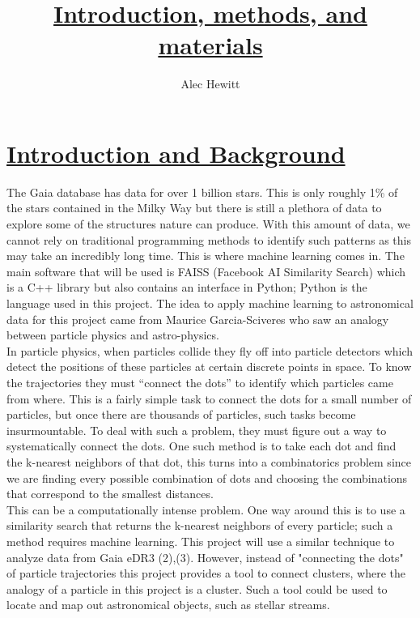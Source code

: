 \documentclass[12pt]{amsart}
\begin{document}
\title{\underline{Introduction, methods, and materials}}
\author{Alec Hewitt}
\maketitle

\setlength\parindent{24pt}

\section{\underline{Introduction and Background}}

\indent The Gaia database has data for over 1 billion stars. This is only roughly 1\% of the stars
contained in the Milky Way but there is still a plethora of data to explore some of the structures
nature can produce. With this amount of data, we cannot rely on traditional programming methods to identify such patterns as this may take an incredibly long time. This is where machine
learning comes in. The main software that will be used is FAISS (Facebook AI Similarity
Search) which is a C++ library but also contains an interface in Python; Python is the language
used in this project. The idea to apply machine learning to astronomical data for this project
came from Maurice Garcia-Sciveres who saw an analogy between particle physics and astro-physics.\\

\indent In particle physics, when particles collide they fly off into particle detectors which detect
the positions of these particles at certain discrete points in space. To know the trajectories they
must “connect the dots” to identify which particles came from where. This is a fairly simple task
to connect the dots for a small number of particles, but once there are thousands of particles,
such tasks become insurmountable. To deal with such a problem, they must figure out a way to
systematically connect the dots. One such method is to take each dot and find the k-nearest
neighbors of that dot, this turns into a combinatorics problem since we are finding every possible
combination of dots and choosing the combinations that correspond to the smallest distances.\\

\indent This can be a computationally intense problem. One way around this is to use a similarity search
that returns the k-nearest neighbors of every particle; such a method requires machine learning.
This project will use a similar technique to analyze data from Gaia eDR3 (2),(3). However, instead of "connecting the dots" of particle trajectories this project provides a tool to connect clusters, where the analogy of a particle in this project is a cluster. Such a tool could be used to locate and map out astronomical objects, such as stellar streams.
\end{document}
